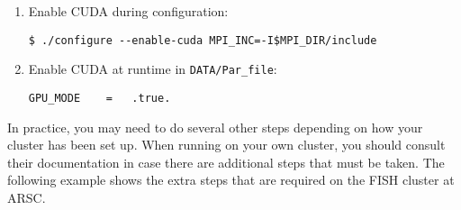 \documentclass[10pt,fleqn,letterpaper]{article}
\begin{document}
\begin{enumerate}
\item Enable CUDA during configuration:
\begin{lstlisting}
$ ./configure --enable-cuda MPI_INC=-I$MPI_DIR/include
\end{lstlisting}

\item Enable CUDA at runtime in \verb|DATA/Par_file|:
\begin{lstlisting}
GPU_MODE    =   .true.
\end{lstlisting}
\end{enumerate}

In practice, you may need to do several other steps depending on how your
cluster has been set up. When running on your own cluster, you should consult
their documentation in case there are additional steps that must be taken. The
following example shows the extra steps that are required on the FISH cluster
at ARSC.
\end{document}
